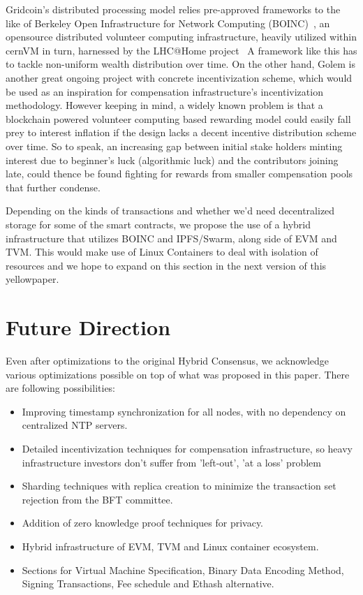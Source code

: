 \documentclass[9pt,oneside]{amsart}
\begin{document}
\begin{multicols}{2}
Gridcoin's distributed processing model relies pre-approved frameworks to the like of Berkeley Open Infrastructure
for Network Computing (BOINC)~\cite{boincproject}, an opensource distributed volunteer computing infrastructure,
heavily utilized within cernVM\cite{cernvm} in turn, harnessed by the LHC@Home project~\cite{lhcathome}
A framework like this has to tackle non-uniform wealth distribution over time. On the other hand, Golem is another great
ongoing project with concrete incentivization scheme, which would be used as an inspiration for compensation infrastructure's
incentivization methodology. However keeping in mind, a widely known problem is that a blockchain powered volunteer computing
based rewarding model could easily fall prey to interest inflation if the design lacks a decent incentive distribution scheme over time.
So to speak, an increasing gap between initial stake holders minting interest due to beginner's luck (algorithmic luck) and the contributors
joining late, could thence be found fighting for rewards from smaller compensation pools that further condense.

Depending on the kinds of transactions and whether we'd need decentralized storage for some of the smart contracts, we propose the use of
a hybrid infrastructure that utilizes BOINC and IPFS/Swarm, along side of EVM and TVM. This would make use of Linux Containers to deal with
isolation of resources and we hope to expand on this section in the next version of this yellowpaper.

\section{Future Direction}

Even after optimizations to the original Hybrid Consensus, we acknowledge various optimizations possible on top of what was
proposed in this paper. There are following possibilities:

\begin{itemize}
  \item Improving timestamp synchronization for all nodes, with no dependency on centralized NTP servers.
  \item Detailed incentivization techniques for compensation infrastructure, so heavy infrastructure investors don't suffer from 'left-out', 'at a loss' problem
  \item Sharding techniques with replica creation to minimize the transaction set rejection from the BFT committee.
  \item Addition of zero knowledge proof techniques for privacy.
  \item Hybrid infrastructure of EVM, TVM and Linux container ecosystem.
  \item Sections for Virtual Machine Specification, Binary Data Encoding Method, Signing Transactions, Fee schedule and Ethash alternative.
\end{itemize}


\end{multicols}
\end{document}

